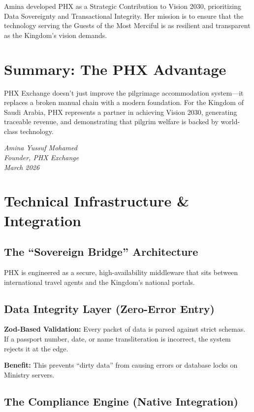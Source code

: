 \documentclass[11pt,a4paper]{article}
\begin{document}
Amina developed PHX as a Strategic Contribution to Vision 2030, prioritizing Data Sovereignty and Transactional Integrity. Her mission is to ensure that the technology serving the Guests of the Most Merciful is as resilient and transparent as the Kingdom's vision demands.

\section{Summary: The PHX Advantage}

PHX Exchange doesn't just improve the pilgrimage accommodation system---it replaces a broken manual chain with a modern foundation. For the Kingdom of Saudi Arabia, PHX represents a partner in achieving Vision 2030, generating traceable revenue, and demonstrating that pilgrim welfare is backed by world-class technology.

\vspace{1cm}
\noindent\textit{Amina Yussuf Mohamed}\\
\textit{Founder, PHX Exchange}\\
\textit{March 2026}

\newpage

\appendix
\section{Technical Infrastructure \& Integration}

\subsection*{The ``Sovereign Bridge'' Architecture}

PHX is engineered as a secure, high-availability middleware that sits between international travel agents and the Kingdom's national portals.

\subsection{Data Integrity Layer (Zero-Error Entry)}

\textbf{Zod-Based Validation:} Every packet of data is parsed against strict schemas. If a passport number, date, or name transliteration is incorrect, the system rejects it at the edge.

\textbf{Benefit:} This prevents ``dirty data'' from causing errors or database locks on Ministry servers.

\subsection{The Compliance Engine (Native Integration)}
\end{document}
